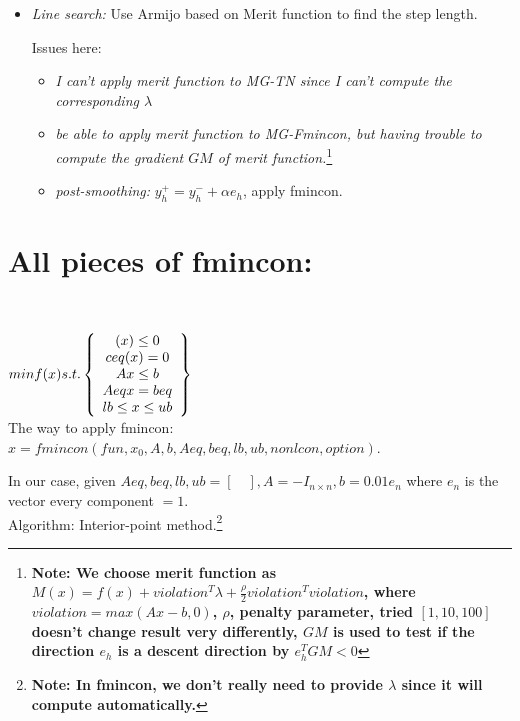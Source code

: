 \documentclass[10pt]{article}
\begin{document}
\begin{itemize}
\item{\em Line search:}
Use Armijo based on Merit function to find the step length.\

Issues here: \
\begin{itemize}
\item{\em I can't apply merit function to MG-TN since I can't compute the corresponding $\lambda$}\

\item{\em be able to apply merit function to MG-Fmincon, but having trouble to compute the gradient $GM$ of merit function.}\footnote{\bf Note: We choose merit function as $M(x)= f(x)+ violation^{T}\lambda +\frac{ \rho} {2} violation^{T} violation$, where $violation = max(Ax-b,0)$, $\rho$, penalty parameter, tried $[1,10,100]$ doesn't change result very differently, $GM$ is used to test if the direction $e_{h}$ is a descent direction by $e_{h}^{T}GM< 0$}

\item{\em post-smoothing:} 
$y_{h}^{+}=y_{h}^{-}+\alpha e_{h}$, apply fmincon.
\end{itemize}

\end{itemize}

\section{All pieces of fmincon:}\

 $min f(x) s.t. \left\{
\begin{array}
c(x)\leq 0\\
ceq(x)=0\\
Ax \leq b\\
Aeqx = beq\\
lb \leq x \leq ub\\
\end{array}\right\}$\\

The way to apply fmincon: $x=fmincon(fun, x_{0}, A, b, Aeq, beq, lb, ub, nonlcon, option).$\

In our case, given $Aeq, beq, lb, ub = [\quad], A= -I_{n\times n}, b= 0.01 e_{n}$ where $e_{n}$ is the vector every component $=1.$\\

Algorithm: Interior-point method.\footnote{\bf Note: In fmincon, we don't really need to provide $\lambda$ since it will compute automatically.}\
\end{document}
